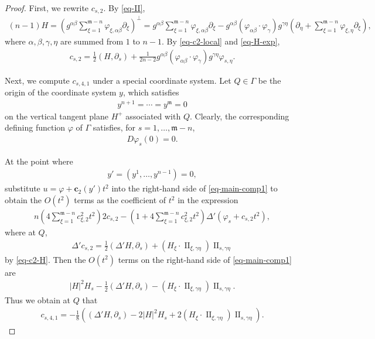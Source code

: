 \documentclass[11pt,reqno]{amsart}
\newcommand{\fm}{\mathfrak{m}}
\theoremstyle{definition}
\numberwithin{equation}{section}
\begin{document}
\begin{proof}
    First, we rewrite \(c_{s,2}\). By \eqref{eq-II},
\begin{align}\label{eq-H-exp}
    (n-1)H = \left(g^{\alpha\beta}\sum_{\xi=1}^{\fm-n} \varphi_{\xi, \alpha\beta}\partial_{\xi}\right)^\perp
    = g^{\alpha\beta}\sum_{\xi=1}^{\fm-n} \varphi_{\xi, \alpha\beta}\partial_{\xi}
    - g^{\alpha\beta} (\varphi_{\alpha\beta}\cdot \varphi_\gamma)g^{\gamma\eta}\left(\partial_\eta+ \sum_{\xi=1}^{\fm-n} \varphi_{\xi, \eta} \partial_{\xi}\right),
\end{align}
where \(\alpha, \beta, \gamma, \eta\) are summed from \(1\) to \(n-1\). By \eqref{eq-c2-local} and \eqref{eq-H-exp},
\begin{align}\label{eq-c2-H}
    c_{s,2} = \frac{1}{2}(H, \partial_s) +\frac{1}{2n-2} g^{\alpha\beta} (\varphi_{\alpha\beta}\cdot \varphi_\gamma)g^{\gamma\eta}\varphi_{s, \eta}.
\end{align}

Next, we compute \(c_{s, 4,1}\) under a special coordinate system. Let \(Q\in \Gamma\) be the origin of the coordinate system \(y\), which satisfies
\begin{align}
    y^{n+1} = \cdots = y^\fm = 0
\end{align}
on the vertical tangent plane \(H^+\) associated with \(Q\). Clearly, the corresponding defining function \(\varphi\) of \(\Gamma\) satisfies, for \(s=1,\dots, \fm-n\),
\begin{align}\label{eq-Dvarphi-0}
    D\varphi_s (0) = 0.
\end{align}

At the point where
\begin{align}
    y' = (y^1,\dots, y^{n-1}) = 0,
\end{align}
substitute \(u = \varphi + \mathbf{c}_2(y') t^2\) into the right-hand side of \eqref{eq-main-comp1} to obtain the \(O(t^2)\) terms as the coefficient of \(t^2\) in the expression
\begin{align}
    n\left(4\sum_{\xi=1}^{\fm-n} c_{\xi, 2}^2t^2\right)2c_{s,2}
    - \left(1+4 \sum_{\xi=1}^{\fm-n} c_{\xi,2}^2 t^2\right)\Delta' \left(\varphi_s +c_{s,2}t^2\right),
\end{align}
where at \(Q\),
\begin{align}
    \Delta' c_{s,2} = \frac{1}{2}(\Delta'H,\partial_s) + (H_{\xi} \cdot \operatorname{II}_{\xi,\gamma\eta}) \operatorname{II}_{s,\gamma\eta}
\end{align}
by \eqref{eq-c2-H}. Then the \(O(t^2)\) terms on the right-hand side of \eqref{eq-main-comp1} are
\begin{align}\label{eq-c-4-RHS}
    |H|^2 H_s - \frac{1}{2}(\Delta'H,\partial_s) - (H_{\xi} \cdot \operatorname{II}_{\xi,\gamma\eta}) \operatorname{II}_{s,\gamma\eta}.
\end{align}
Thus we obtain at \(Q\) that
\begin{align}\label{eq-c41-Q}
    c_{s,4,1} = -\frac{1}{8} \left( (\Delta'H,\partial_s)-2|H|^2 H_s + 2(H_{\xi} \cdot \operatorname{II}_{\xi,\gamma\eta}) \operatorname{II}_{s,\gamma\eta}\right).
\end{align}


\end{proof}
\end{document}

